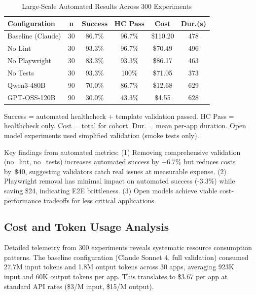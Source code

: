 \documentclass[conference]{IEEEtran}
\begin{document}
\begin{table}[!t]
\caption{Large-Scale Automated Results Across 300 Experiments}
\label{tab:large-scale-automated}
\centering
\small
\begin{threeparttable}
\begin{tabular}{@{}lccccc@{}}
\toprule
\textbf{Configuration} & \textbf{n} & \textbf{Success} & \textbf{HC Pass} & \textbf{Cost} & \textbf{Dur.(s)} \\
\midrule
Baseline (Claude) & 30 & 86.7\% & 96.7\% & \$110.20 & 478 \\
No Lint & 30 & 93.3\% & 96.7\% & \$70.49 & 496 \\
No Playwright & 30 & 83.3\% & 93.3\% & \$86.17 & 463 \\
No Tests & 30 & 93.3\% & 100\% & \$71.05 & 373 \\
\midrule
Qwen3-480B & 90 & 70.0\% & 86.7\% & \$12.68 & 629 \\
GPT-OSS-120B & 90 & 30.0\% & 43.3\% & \$4.55 & 628 \\
\bottomrule
\end{tabular}
\begin{tablenotes}\footnotesize
\item Success = automated healthcheck + template validation passed. HC Pass = healthcheck only. Cost = total for cohort. Dur. = mean per-app duration. Open model experiments used simplified validation (smoke tests only).
\end{tablenotes}
\end{threeparttable}
\end{table}

Key findings from automated metrics: (1) Removing comprehensive validation (no\_lint, no\_tests) increases automated success by +6.7\% but reduces costs by~\$40, suggesting validators catch real issues at measurable expense. (2) Playwright removal has minimal impact on automated success (-3.3\%) while saving \$24, indicating E2E brittleness. (3) Open models achieve viable cost-performance tradeoffs for less critical applications.

\subsection{Cost and Token Usage Analysis}

Detailed telemetry from 300 experiments reveals systematic resource consumption patterns. The baseline configuration (Claude Sonnet 4, full validation) consumed 27.7M input tokens and 1.8M output tokens across 30 apps, averaging 923K input and 60K output tokens per app. This translates to \$3.67 per app at standard API rates (\$3/M input, \$15/M output).
\end{document}
